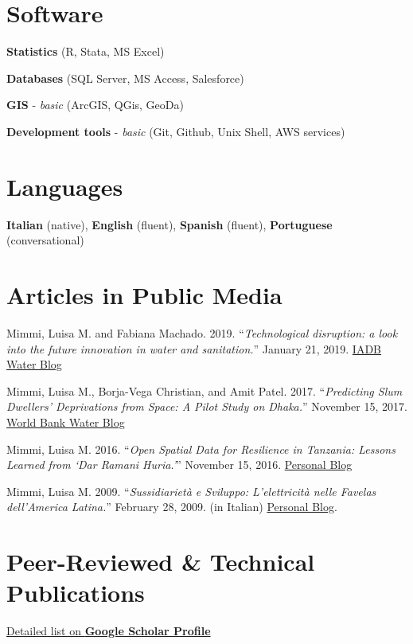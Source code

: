 \documentclass[10pt,a4paper,]{twentysecondcv}
\begin{document}
\hypertarget{software}{%
\section{Software}\label{software}}

\textbf{Statistics} (R, Stata, MS Excel)

\textbf{Databases} (SQL Server, MS Access, Salesforce)

\textbf{GIS} - \emph{basic} (ArcGIS, QGis, GeoDa)

\textbf{Development tools} - \emph{basic} (Git, Github, Unix Shell, AWS
services)

\hypertarget{languages}{%
\section{Languages}\label{languages}}

\textbf{Italian} (native), \textbf{English} (fluent), \textbf{Spanish}
(fluent), \textbf{Portuguese} (conversational)

\hypertarget{articles-in-public-media}{%
\section{Articles in Public Media}\label{articles-in-public-media}}

Mimmi, Luisa M. and Fabiana Machado. 2019. ``\emph{Technological
disruption: a look into the future innovation in water and
sanitation.}'' January 21, 2019.
\href{https://blogs.iadb.org/agua/en/technological-disruption-a-look-into-the-future-innovation-in-water-and-sanitation/}{IADB
Water Blog}

Mimmi, Luisa M., Borja-Vega Christian, and Amit Patel. 2017.
``\emph{Predicting Slum Dwellers' Deprivations from Space: A Pilot Study
on Dhaka.}'' November 15, 2017.
\href{https://blogs.worldbank.org/water/predicting-slum-dwellers-deprivations-space-pilot-study-dhaka}{World
Bank Water Blog}

Mimmi, Luisa M. 2016. ``\emph{Open Spatial Data for Resilience in
Tanzania: Lessons Learned from `Dar Ramani Huria.'}'' November 15, 2016.
\href{https://lulliter.github.io/post/2016-11-15_ramani-huria/}{Personal
Blog}

Mimmi, Luisa M. 2009. ``\emph{Sussidiarietà e Sviluppo: L'elettricità
nelle \emph{Favelas} dell'America Latina.}'' February 28, 2009. (in
Italian)
\href{https://lulliter.github.io/post/sussidiariet\%C3\%A0-e-sviluppo/}{Personal
Blog}.

\hypertarget{peer-reviewed-technical-publications}{%
\section{Peer-Reviewed \& Technical
Publications}\label{peer-reviewed-technical-publications}}

\href{https://scholar.google.com/citations?user=OBYla5gAAAAJ\&hl=en\&oi=ao}{Detailed
list on \textbf{Google Scholar Profile}}

\endfirstpage
\end{document}
